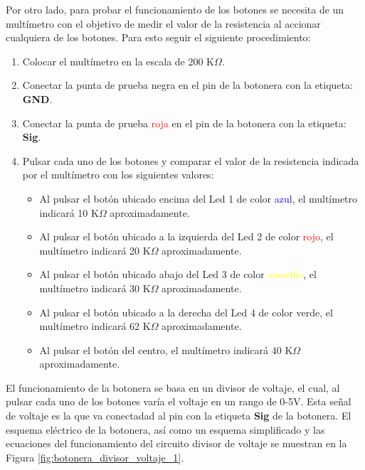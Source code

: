 \documentclass{article}
\begin{document}
Por otro lado, para probar el funcionamiento de los botones se necesita de un multímetro con el objetivo de medir el valor de la resistencia al accionar cualquiera de los botones. Para esto seguir el siguiente procedimiento:
\begin{enumerate}
    \item Colocar el multímetro en la escala de 200 K$\Omega$.
    \item Conectar la punta de prueba negra en el pin de la botonera con la etiqueta: \textbf{GND}.
    \item Conectar la punta de prueba \textcolor{red}{roja} en el pin de la botonera con la etiqueta: \textbf{Sig}.
    \item Pulsar cada uno de los botones y comparar el valor de la resistencia indicada por el multímetro con los siguientes valores:
    \begin{itemize}
        \item Al pulsar el botón ubicado encima del Led 1 de color  \textcolor{blue}{azul}, el multímetro indicará 10 K$\Omega$ aproximadamente.
        \item Al pulsar el botón ubicado a la izquierda del Led 2 de color  \textcolor{red}{rojo}, el multímetro indicará 20 K$\Omega$ aproximadamente.
        \item Al pulsar el botón ubicado abajo del Led 3 de color  \textcolor{yellow}{amarillo}, el multímetro indicará 30 K$\Omega$ aproximadamente.
        \item Al pulsar el botón ubicado a la derecha del Led 4 de color \textcolor{OliveGreen}{verde}, el multímetro indicará 62 K$\Omega$ aproximadamente.
        \item Al pulsar el botón del centro, el multímetro indicará 40 K$\Omega$ aproximadamente.
    \end{itemize}
\end{enumerate}

El funcionamiento de la botonera se basa en un divisor de voltaje, el cual, al pulsar cada uno de los botones varía el voltaje en un rango de 0-5V. Esta señal de voltaje es la que va conectadad al pin con la etiqueta \textbf{Sig} de la botonera. El esquema eléctrico de la botonera, así como un esquema simplificado y las ecuaciones del funcionamiento del circuito divisor de voltaje se muestran en la Figura \ref{fig:botonera_divisor_voltaje_1}.
\end{document}
